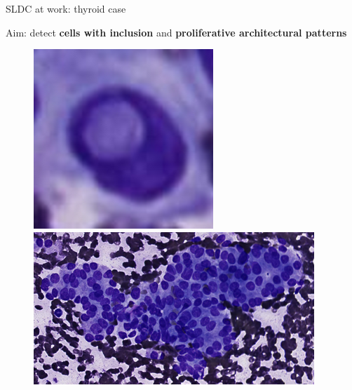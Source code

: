 \documentclass{beamer}
\begin{document}
\begin{frame}{SLDC at work: thyroid case}
	\begin{center}	
		Aim: detect \textbf{cells with inclusion} and \textbf{proliferative architectural patterns}
	\end{center}
	\begin{figure}
		\includegraphics[scale=0.35]{images/incl1.png}
		\hspace{1cm}
		\includegraphics[scale=0.55]{images/prolif_pattern_1.png}
	\end{figure}
\end{frame}
\end{document}
